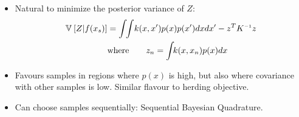 \documentclass[usenames,dvipsnames]{beamer}
\begin{document}
\begin{frame}[plain, t]
	\titlebodyskip
\pause
\begin{itemize}
\item Natural to minimize the posterior variance of $Z$:
\begin{align*}
\varianceargs{}{Z|f(x_s)} & = \int \! \! \int \! k(\vx, \vx') p(x) p(x') dx dx' - \vz^T K\inv \vz \\
& \textrm{where} \qquad z_n = \int\!\! k(\vx, \vx_n) p(\vx) d\vx
\end{align*}
\pause
\item Favours samples in regions where $p(x)$ is high, but also where covariance with other samples is low.  Similar flavour to herding objective.
\pause
\item Can choose samples sequentially: Sequential Bayesian Quadrature.
\end{itemize}

	
\end{frame}


\end{document}
